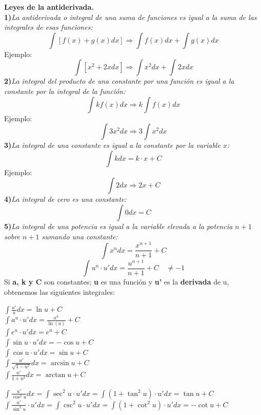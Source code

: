\documentclass[11pt]{report}
\begin{document}
\pagebreak \textbf{Leyes de la antiderivada.}\\[2mm]
\textbf{1)}\textit{La antiderivada o integral de una suma de funciones es igual a la suma de las integrales de esas funciones:}
$$\int [f(x)+g(x)dx] \Longrightarrow \int f(x)dx+\int g(x)dx$$
Ejemplo:
$$\int [x^2+2x dx] \Longrightarrow \int x^2dx+\int 2xdx$$
\textbf{2)}\textit{La integral del producto de una constante por una función es igual a la constante por la integral de la función:}
$$\int kf(x)dx \Longrightarrow k\int f(x)dx$$
Ejemplo:
$$\int 3x^2dx \Longrightarrow 3\int x^2dx$$
\textbf{3)}\textit{La integral de una constante es igual a la constante por la variable $x$:}
$$\int kdx = k\cdot x +C$$
Ejemplo:
$$\int 2dx \Longrightarrow 2x+C$$
\textbf{4)}\textit{La integral de cero es una constante:}
$$\int 0dx = C$$
\textbf{5)}\textit{La integral de una potencia es igual a la variable elevada a la potencia $n+1$ sobre $n+1$ sumando una constante:}
$$\int x^ndx= \frac{x^{n+1}}{n+1}+C$$
$$\int u^n\cdot u'dx=\frac{u^{n+1}}{n+1}+C\quad \neq -1$$
Si \textbf{a, k y C} son constantes; \textbf{u} es una función y \textbf{u'} es la \textbf{derivada} de u, obtenemos las siguientes integrales:\\[2mm]
\begin{multicols}{2}
\hspace*{10mm}$\displaystyle\int \frac{u'}{u}dx=\ln u +C$\\[2mm]
\hspace*{10mm}$\displaystyle\int a^u\cdot u'dx=\frac{a^u}{\ln (a)}+C$\\[2mm]
\hspace*{10mm}$\displaystyle\int e^u\cdot u'dx=e^u+C$\\[2mm]
\hspace*{10mm}$\displaystyle\int \sin u \cdot u'dx = -\cos u +C$\\[2mm]
\hspace*{10mm}$\displaystyle\int \cos u \cdot u'dx = \sin u +C$\\[2mm]
\hspace*{10mm}$\displaystyle\int \frac{u'}{\sqrt{1-u^2}}dx=\arcsin u +C$\\[2mm]
\hspace*{10mm}$\displaystyle\int \frac{u'}{1+u^2}dx=\arctan u +C$\\[2mm]
\end{multicols}
\hspace*{10mm}$\displaystyle\int \frac{u'}{\cos^2u}dx=\int \sec^2u\cdot u'dx=\int (1+ \tan^2u)\cdot u'dx=\tan u +C$\\[2mm]
\hspace*{10mm}$\displaystyle\int \frac{u'}{\sin^2u}\cdot u'dx=\int \csc^2u\cdot u'dx=\int (1+ \cot^2u)\cdot u'dx=-\cot u +C$\\[2mm]
\end{document}
